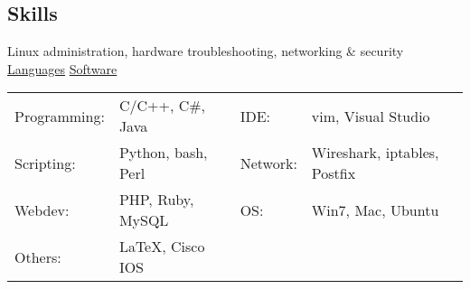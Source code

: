 \documentclass[margin,line]{res}
\newenvironment{list2}{
  \begin{list}{$\bullet$}{%
      \setlength{\itemsep}{0in}
      \setlength{\parsep}{0in} \setlength{\parskip}{0in}
      \setlength{\topsep}{0in} \setlength{\partopsep}{0in} 
      \setlength{\leftmargin}{0.18in}}}{\end{list}}
\begin{document}
\begin{resume}
\section{\sc Skills} 
Linux administration, hardware troubleshooting, networking \& security \\
\underline{Languages} \hspace{2.51in} \underline{Software}\\
\begin{tabular}{@{}p{0.9in}p{2in}p{0.5in}p{4in}}
Programming:   & C/C++, C\#, Java           & IDE:        & vim, Visual Studio \\
Scripting:     & Python, bash, Perl         & Network:    & Wireshark, iptables, Postfix \\
Webdev:        & PHP, Ruby, MySQL           & OS:         & Win7, Mac, Ubuntu\\
Others:        & \LaTeX, Cisco IOS          & &
\end{tabular}


%
%


\end{resume}
\end{document}
